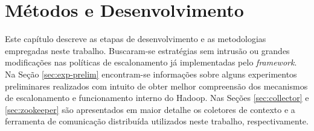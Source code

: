 \chapter{Métodos e Desenvolvimento}
Este capítulo descreve as etapas de desenvolvimento e as metodologias empregadas neste trabalho. Buscaram-se estratégias sem intrusão ou grandes modificações nas políticas de escalonamento já implementadas pelo \textit{framework}. Na Seção \ref{sec:exp-prelim} encontram-se informações sobre alguns experimentos preliminares realizados com intuito de obter melhor compreensão dos mecanismos de escalonamento e funcionamento interno do Hadoop. Nas Seções \ref{sec:collector} e \ref{sec:zookeeper} são apresentados em maior detalhe os coletores de contexto e a ferramenta de comunicação distribuída utilizados neste trabalho, respectivamente. 

